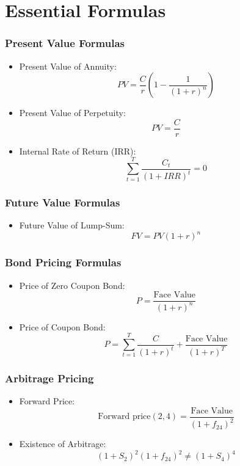 \documentclass[twoside,openany]{book}
\begin{document}
\chapter*{Essential Formulas}

\subsection*{Present Value Formulas}
\begin{itemize}
    \item Present Value of Annuity:
    \[ PV = \frac{C}{r}\left(1 - \frac{1}{(1+r)^n}\right) \]
    \item Present Value of Perpetuity:
    \[ PV = \frac{C}{r} \]
    \item Internal Rate of Return (IRR):
    \[ \sum_{t=1}^T \frac{C_t}{(1+IRR)^t} = 0 \]
\end{itemize}

\subsection*{Future Value Formulas}
\begin{itemize}
    \item Future Value of Lump-Sum:
    \[ FV = PV(1 + r)^n \]
\end{itemize}

\subsection*{Bond Pricing Formulas}
\begin{itemize}
    \item Price of Zero Coupon Bond:
    \[ P = \frac{\text{Face Value}}{(1 + r)^n} \]
    \item Price of Coupon Bond:
    \[ P = \sum_{t=1}^T \frac{C}{(1 + r)^t} + \frac{\text{Face Value}}{(1 + r)^T} \]
\end{itemize}

\subsection*{Arbitrage Pricing}
\begin{itemize}
    \item Forward Price:
    \[ \text{Forward price}(2,4) = \frac{\text{Face Value}}{(1 + f_{24})^2} \]
    \item Existence of Arbitrage:
    \[ (1 + S_2)^2(1 + f_{24})^2 \neq (1 + S_4)^4 \]
\end{itemize}
\end{document}

